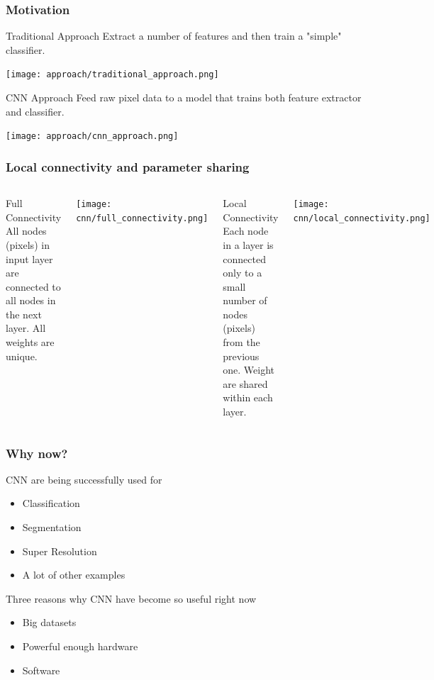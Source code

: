 \documentclass{beamer}
\begin{document}
%
%

\begin{frame}
\frametitle{Motivation}

\begin{block}{Traditional Approach}
Extract a number of features and then train a "simple" classifier.
\end{block}
\texttt{[image: approach/traditional\_approach.png]}

\begin{block}{CNN Approach}
Feed raw pixel data to a model that trains both feature extractor and classifier.
\end{block}
\texttt{[image: approach/cnn\_approach.png]}

\end{frame}

\begin{frame}
\frametitle{Local connectivity and parameter sharing}
\begin{columns}
\begin{block}{Full Connectivity}
All nodes (pixels) in input layer are connected to all nodes in the next layer. All weights are unique.
\end{block}
\vskip 0.55in
\texttt{[image: cnn/full\_connectivity.png]}
\begin{block}{Local Connectivity}
Each node in a layer is connected only to a small number of nodes (pixels) from the previous one. Weight are shared within each layer.	
\end{block}
\vskip 0.2in
\texttt{[image: cnn/local\_connectivity.png]}
\end{columns}
\end{frame}

\begin{frame}
\frametitle{Why now?}

CNN are being successfully used for
\begin{itemize}
\item Classification
\item Segmentation
\item Super Resolution
\item A lot of other examples
\end{itemize}

\vskip 0.3in

Three reasons why CNN have become so useful right now
\begin{itemize}
\item Big datasets
\item Powerful enough hardware
\item Software
\end{itemize}

\end{frame}
\end{document}
